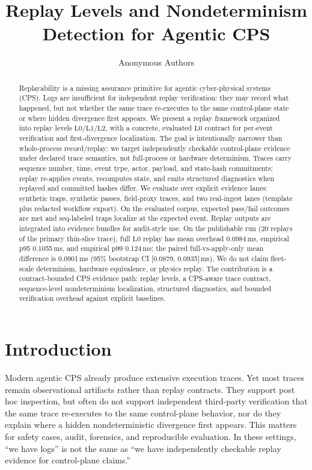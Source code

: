 \documentclass[11pt]{article}
\title{\textbf{Replay Levels and Nondeterminism Detection for Agentic CPS}}
\author{Anonymous Authors}
\date{}
\newcommand{\Lzero}{\ensuremath{\mathrm{L0}}}
\newcommand{\Lone}{\ensuremath{\mathrm{L1}}}
\newcommand{\Ltwo}{\ensuremath{\mathrm{L2}}}
\begin{document}
\maketitle

\begin{abstract}
Replayability is a missing assurance primitive for agentic cyber-physical systems (CPS). Logs are insufficient for independent replay verification: they may record what happened, but not whether the same trace re-executes to the same control-plane state or where hidden divergence first appears. We present a replay framework organized into replay levels \Lzero/\Lone/\Ltwo, with a concrete, evaluated \Lzero{} contract for per-event verification and first-divergence localization. The goal is intentionally narrower than whole-process record/replay: we target independently checkable control-plane evidence under declared trace semantics, not full-process or hardware determinism. Traces carry sequence number, time, event type, actor, payload, and state-hash commitments; replay re-applies events, recomputes state, and emits structured diagnostics when replayed and committed hashes differ. We evaluate over explicit evidence lanes: synthetic traps, synthetic passes, field-proxy traces, and two real-ingest lanes (template plus redacted workflow export). On the evaluated corpus, expected pass/fail outcomes are met and seq-labeled traps localize at the expected event. Replay outputs are integrated into evidence bundles for audit-style use. On the publishable run (20 replays of the primary thin-slice trace), full \Lzero{} replay has mean overhead 0.0984\,ms, empirical p95 0.1055\,ms, and empirical p99 0.124\,ms; the paired full-vs-apply-only mean difference is 0.0901\,ms (95\% bootstrap CI [0.0879, 0.0935]\,ms). We do not claim fleet-scale determinism, hardware equivalence, or physics replay. The contribution is a contract-bounded CPS evidence path: replay levels, a CPS-aware trace contract, sequence-level nondeterminism localization, structured diagnostics, and bounded verification overhead against explicit baselines.
\end{abstract}

\section{Introduction}

Modern agentic CPS already produce extensive execution traces. Yet most traces remain observational artifacts rather than replay contracts. They support post hoc inspection, but often do not support independent third-party verification that the same trace re-executes to the same control-plane behavior, nor do they explain where a hidden nondeterministic divergence first appears. This matters for safety cases, audit, forensics, and reproducible evaluation. In these settings, ``we have logs'' is not the same as ``we have independently checkable replay evidence for control-plane claims.''
\end{document}
